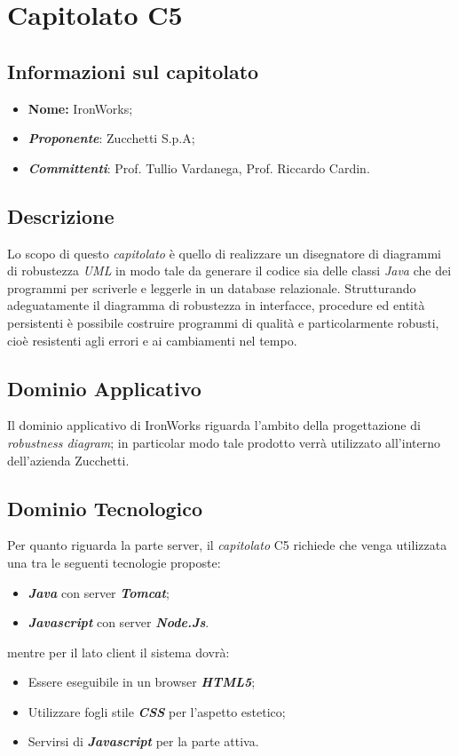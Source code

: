 \section{Capitolato C5}
\subsection{Informazioni sul capitolato}
	\begin{itemize}
		\item \textbf{Nome:}
		IronWorks;
		\item \textbf{\textit{Proponente}}:
		Zucchetti S.p.A;
		\item \textbf{\textit{Committenti}}:
		Prof. Tullio Vardanega, Prof. Riccardo Cardin.
	\end{itemize}

\subsection{Descrizione}
	Lo scopo di questo \textit{capitolato} è quello di realizzare un disegnatore di diagrammi di robustezza \textit{UML} in modo tale da generare il codice sia delle classi \textit{Java} che dei programmi per scriverle e leggerle in un database relazionale.
	\newline \newline Strutturando adeguatamente il diagramma di robustezza in interfacce, procedure ed entità persistenti è possibile costruire programmi di qualità e particolarmente robusti, cioè resistenti agli errori e ai cambiamenti nel tempo.
	
\subsection{Dominio Applicativo}
	Il dominio applicativo di IronWorks riguarda l'ambito della progettazione di \textit{robustness diagram}; in particolar modo tale prodotto verrà utilizzato all'interno dell'azienda Zucchetti.
	
\subsection{Dominio Tecnologico}
	Per quanto riguarda la parte server, il \textit{capitolato} C5 richiede che venga utilizzata una tra le seguenti tecnologie proposte:
	\begin{itemize}
		\item \textit{\textbf{Java}} con server \textit{\textbf{Tomcat}};
		\item \textit{\textbf{Javascript}} con server \textit{\textbf{Node.Js}}.
	\end{itemize}
	mentre per il lato client il sistema dovrà:
	\begin{itemize}
		\item Essere eseguibile in un browser \textit{\textbf{HTML5}};
		\item Utilizzare fogli stile \textit{\textbf{CSS}} per l’aspetto estetico;
		\item Servirsi di \textit{\textbf{Javascript}} per la parte attiva.
	\end{itemize}
	
